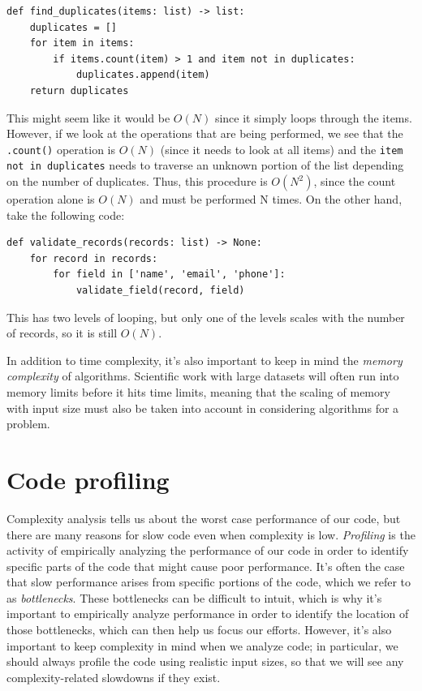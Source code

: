 \begin{lstlisting}[style=Python]
def find_duplicates(items: list) -> list:
    duplicates = []
    for item in items:
        if items.count(item) > 1 and item not in duplicates:
            duplicates.append(item)
    return duplicates
\end{lstlisting}

This might seem like it would be $O(N)$ since it simply loops through the items.  However, if we look at the operations that are being performed, we see that the \texttt{.count()} operation is $O(N)$ (since it needs to look at all items) and the \texttt{item not in duplicates} needs to traverse an unknown portion of the list depending on the number of duplicates. Thus, this procedure is $O(N^2)$, since the count operation alone is $O(N)$ and must be performed N times.  On the other hand, take the following code:

\begin{lstlisting}[style=Pythonshort]
def validate_records(records: list) -> None:
    for record in records:
        for field in ['name', 'email', 'phone']:
            validate_field(record, field)
\end{lstlisting}

This has two levels of looping, but only one of the levels scales with the number of records, so it is still $O(N)$.

In addition to time complexity, it's also important to keep in mind the \textit{memory complexity} of algorithms.  Scientific work with large datasets will often run into memory limits before it hits time limits, meaning that the scaling of memory with input size must also be taken into account in considering algorithms for a problem.

\section{Code profiling}

Complexity analysis tells us about the worst case performance of our code, but there are many reasons for slow code even when complexity is low.  \textit{Profiling} is the activity of empirically analyzing the performance of our code in order to identify specific parts of the code that might cause poor performance.  It's often the case that slow performance arises from specific portions of the code, which we refer to as \textit{bottlenecks}.  These bottlenecks can be difficult to intuit, which is why it's important to empirically analyze performance in order to identify the location of those bottlenecks,  which can then help us focus our efforts.  However, it's also important to keep complexity in mind when we analyze code; in particular, we should always profile the code using realistic input sizes, so that we will see any complexity-related slowdowns if they exist.

